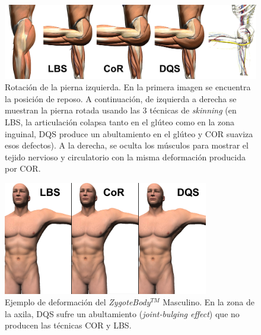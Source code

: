 \begin{figure}[h]%
  \centering
  \includegraphics[width=\textwidth]{IMG/compculo}
    \caption{ Rotación de la pierna izquierda. En la primera imagen se encuentra la posición de reposo. A continuación, de izquierda a derecha se muestran la pierna rotada usando las 3 técnicas de \emph{skinning} (en \ac{LBS}, la articulación colapsa tanto en el glúteo como en la zona inguinal, \ac{DQS} produce un abultamiento en el glúteo y \ac{COR} suaviza esos defectos). A la derecha, se oculta los músculos para mostrar el tejido nervioso y circulatorio con la misma deformación producida por \ac{COR}.}
    \label{fig:thigh_bending}
\end{figure}

\begin{figure}[h]%
  \centering
  \includegraphics[width=0.8\textwidth]{IMG/sobaco.png}
    \caption{Ejemplo de deformación del  \emph{ZygoteBody}$^{TM}$ Masculino. En la zona de la axila, \ac{DQS} sufre un abultamiento (\emph{joint-bulging effect}) que no producen las técnicas \ac{COR} y \ac{LBS}. }
    \label{fig:axila}
\end{figure}






